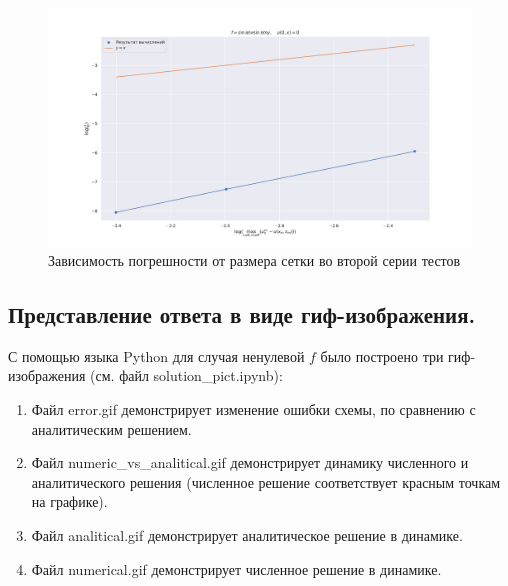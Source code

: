 \documentclass[14pt,a4paper]{extarticle}
\newcommand{\1}{\mathbbm{1}}
\begin{document}
\begin{figure}
    \centering
    \includegraphics[scale=0.4]{figs/OrderCon2.pdf}
    \caption{Зависимость погрешности от размера сетки во второй серии тестов}
    \label{t2}
\end{figure}

\subsection{Представление ответа в виде гиф-изображения.}
С помощью языка Python для случая ненулевой $f$ было построено три гиф-изображения (см. файл solution\_pict.ipynb):
\begin{enumerate}
    \item Файл error.gif демонстрирует изменение ошибки схемы, по сравнению с аналитическим решением.
    \item Файл numeric\_vs\_analitical.gif демонстрирует динамику численного и аналитического решения (численное решение соответствует красным точкам на графике).
    \item Файл analitical.gif демонстрирует аналитическое решение в динамике.
    \item Файл numerical.gif демонстрирует численное решение в динамике.
\end{enumerate}

 
\end{document}
